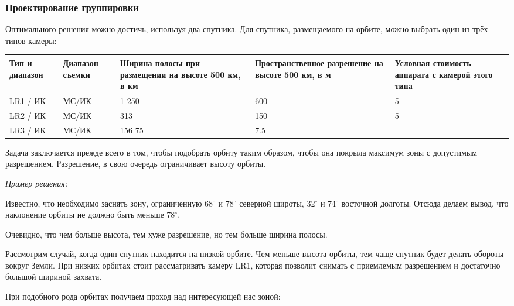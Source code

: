 \subsubsection*{Проектирование группировки}

Оптимального решения можно достичь, используя два спутника. Для спутника, размещаемого на орбите, можно выбрать один из трёх типов камеры:

\begin{table}[H]
    \center
    \begin{tabular}{|p{2cm}|p{2cm}|p{4cm}|p{4cm}|p{4cm}|}
        \hline
        Тип и диапазон	&Диапазон съемки	&Ширина полосы при размещении на высоте 500 км, в км	&Пространственное разрешение на высоте 500 км, в м	&Условная стоимость аппарата с камерой этого типа  \\
        \hline
        LR1 / ИК	&МС/ИК	&1 250	&600	&5 \\
        \hline
        LR2 / ИК	&МС/ИК	&313	&150	&5 \\
        \hline
        LR3 / ИК	&МС/ИК	&156	75	&7.5 \\
        \hline
    \end{tabular}
\end{table}

Задача заключается прежде всего в том, чтобы подобрать орбиту таким образом, чтобы она покрыла максимум зоны с допустимым разрешением. Разрешение, в свою очередь ограничивает высоту орбиты.

\textit{Пример решения:}

Известно, что необходимо заснять зону, ограниченную 68$^\circ$ и 78$^\circ$ северной широты, 32$^\circ$ и 74$^\circ$ восточной долготы. Отсюда делаем вывод, что наклонение орбиты не должно быть меньше 78$^\circ$.

Очевидно, что чем больше высота, тем хуже разрешение, но тем больше ширина полосы. 

Рассмотрим случай, когда один спутник находится на низкой орбите. Чем меньше высота орбиты, тем чаще спутник будет делать обороты вокруг Земли. При низких орбитах стоит рассматривать камеру LR1, которая позволит снимать с приемлемым разрешением и достаточно большой шириной захвата.



При подобного рода орбитах получаем проход над интересующей нас зоной:


